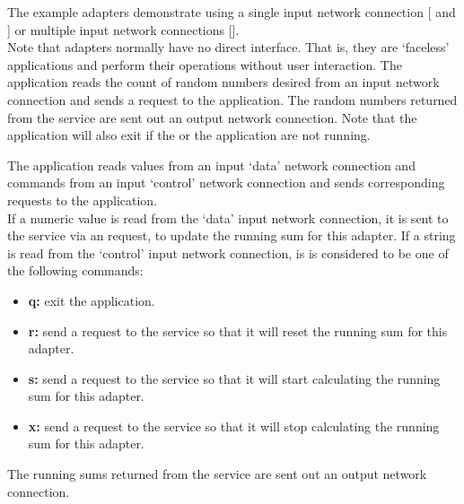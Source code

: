 The example adapters demonstrate using a single input \yarp{} network connection
[ and
] or multiple input \yarp{} network
connections [].\\

Note that adapters normally have no direct interface.
That is, they are `faceless' applications and perform their operations without user
interaction.
The  application reads the count of
random numbers desired from an input \yarp{} network connection and sends a
 request to the
 application.
The random numbers returned from the service are sent out an output \yarp{} network
connection.
Note that the application will also exit if the
 or the
 application are not running.

The  application reads  values from an input
`data' \yarp{} network connection and commands from an input `control' \yarp{} network
connection and sends corresponding requests to the
 application.\\

If a numeric value is read from the `data' input \yarp{} network connection, it is sent to
the service via an  request, to update the
running sum for this adapter.
If a string is read from the `control' input \yarp{} network connection, is is considered
to be one of the following commands:
\begin{itemize}
\item \textbf{q:} exit the application.
\item \textbf{r:} send a  request to the
service so that it will reset the running sum for this adapter.
\item \textbf{s:} send a  request to the
service so that it will start calculating the running sum for this adapter.
\item \textbf{x:} send a  request to the
service so that it will stop calculating the running sum for this adapter.
\end{itemize}
The running sums returned from the service are sent out an output \yarp{} network
connection.\\

